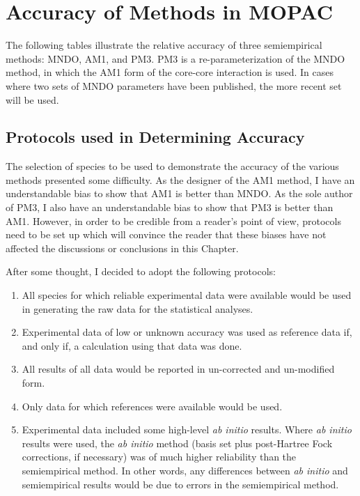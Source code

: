\chapter{Accuracy of Methods in MOPAC} 
The following tables illustrate the relative accuracy of three semiempirical
methods: MNDO, AM1, and PM3. PM3 is a re-parameterization of the MNDO method,
in which the AM1 form of the core-core interaction is used. In cases where two
sets of MNDO parameters have been published, the more recent set will be used. 

\section{Protocols used in Determining Accuracy}
The selection of species to be used to demonstrate the accuracy of the various
methods presented some difficulty.   As the designer of the AM1 method, I have
an understandable bias to show that AM1 is better than MNDO.  As the sole
author of PM3, I also have an understandable bias to show that PM3 is better
than AM1.  However, in order to be credible from a reader's point of view,
protocols need to be set up which will convince the reader that these biases 
have not affected the discussions or conclusions in this Chapter.

After some thought, I decided to adopt the following protocols:
\begin{enumerate}
\item All species for which reliable experimental data were available would be
used in generating the raw data for the statistical analyses.
\item Experimental data of low or unknown accuracy was used as reference data
if, and only if, a calculation using that data was done.
\item All results of all data would be reported in un-corrected and un-modified
form.
\item Only data for which references were available would be used.
\item Experimental data included some high-level {\em ab initio} results. 
Where {\em ab initio} results were used, the {\em ab initio} method (basis set
plus post-Hartree Fock corrections, if necessary) was of much higher
reliability than the semiempirical method.  In other words, any differences
between {\em ab initio} and semiempirical results would be due to errors in the
semiempirical method.
\end{enumerate}

